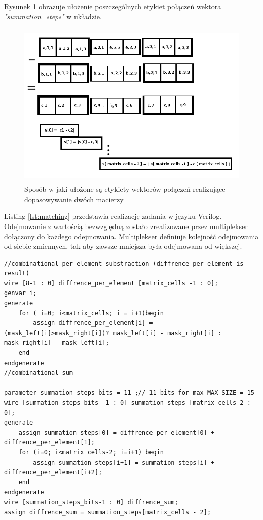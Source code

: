 Rysunek \ref{fig:matching} obrazuje ułożenie poszczególnych etykiet połączeń
wektora \textit{"summation\_steps"} w układzie.

\begin{figure}[h]
    \begin{center}

    \includegraphics[height = 8cm]{figures/combinational_matching.png}
    \caption["Dopasowywanie macierzy"]{Sposób w jaki ułożone są etykiety
    wektorów połączeń realizujące dopasowywanie dwóch macierzy}
    \label{fig:matching}

    \end{center}
\end{figure}

Listing \ref{lst:matching} przedstawia realizację zadania w języku Verilog.
Odejmowanie z wartością bezwzględną zostało zrealizowane przez multiplekser
dołączony do każdego odejmowania. Multiplekser definiuje kolejność odejmowania
od siebie zmiennych, tak aby zawsze mniejsza była odejmowana od większej.

\begin{lstlisting}[caption={Realizacja zadania match-owania macierzy w języku Verilog},
label={lst:match}]
//combinational per element substraction (diffrence_per_element is result)
wire [8-1 : 0] diffrence_per_element [matrix_cells -1 : 0];
genvar i;
generate
	for ( i=0; i<matrix_cells; i = i+1)begin
		assign diffrence_per_element[i] = (mask_left[i]>mask_right[i])? mask_left[i] - mask_right[i] : mask_right[i] - mask_left[i];
	end
endgenerate
//combinational sum

parameter summation_steps_bits = 11 ;// 11 bits for max MAX_SIZE = 15
wire [summation_steps_bits -1 : 0] summation_steps [matrix_cells-2 : 0];
generate
	assign summation_steps[0] = diffrence_per_element[0] + diffrence_per_element[1];
	for (i=0; i<matrix_cells-2; i=i+1) begin
		assign summation_steps[i+1] = summation_steps[i] + diffrence_per_element[i+2];
	end
endgenerate
wire [summation_steps_bits-1 : 0] diffrence_sum;
assign diffrence_sum = summation_steps[matrix_cells - 2];

\end{lstlisting}


